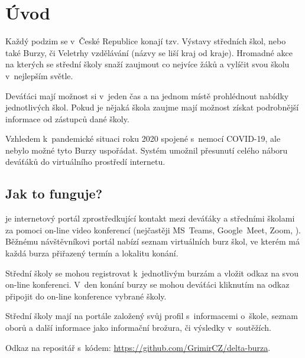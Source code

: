 \chapter*{Úvod}

Každý podzim se v~České Republice konají tzv. Výstavy středních škol, nebo také Burzy, či Veletrhy vzdělávání (názvy se liší kraj od kraje). Hromadné akce na kterých se střední školy snaží zaujmout co nejvíce žáků  a vylíčit svou školu v~nejlepším světle.

Deváťáci mají možnost si v~jeden čas a na jednom místě prohlédnout nabídky jednotlivých škol. Pokud je nějaká škola zaujme mají možnost získat podrobnější informace od zástupců dané školy. 

Vzhledem k~pandemické situaci roku 2020 spojené s~nemocí COVID-19, ale nebylo možné tyto Burzy uspořádat. Systém \bso{} umožnil přesunutí celého náboru deváťáků do virtuálního prostředí internetu.

\section*{Jak to funguje?}
\bso{} je internetový portál zprostředkující kontakt mezi deváťáky a středními školami za pomoci on-line video konferencí (nejčastěji MS~Teams\cite{ms-teams}, Google~Meet\cite{google-meet}, Zoom\cite{zoom}, \cdots). Běžnému návštěvníkovi portál nabízí seznam virtuálních burz škol, ve kterém má každá burza přiřazený termín a lokalitu konání.

Střední školy se mohou registrovat k~jednotlivým burzám a vložit odkaz na svou on-line konferenci. V~den konání burzy se mohou deváťáci kliknutím na odkaz připojit do on-line konference vybrané školy.

Střední školy mají na portále založený svůj profil s~informacemi o~škole, seznam oborů a další informace jako informační brožura, či výsledky v~soutěžích.

Odkaz na repositář s~kódem: \href{https://github.com/GrimirCZ/delta-burza}{https://github.com/GrimirCZ/delta-burza}.

\pagebreak

